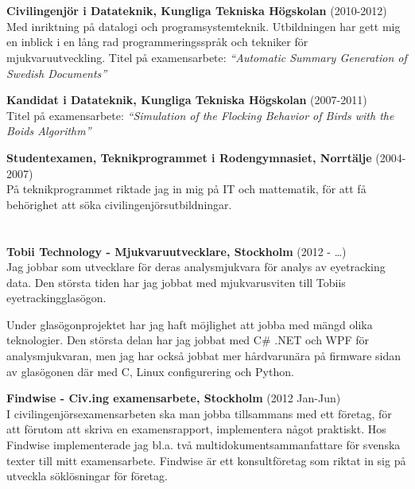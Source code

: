 \documentclass[margin,line]{resume}%
\begin{document}
\begin{resume}
	\section{}\vspace{0.001mm}

	\textbf{Civilingenjör i Datateknik, Kungliga Tekniska Högskolan}
	(2010-2012)\\
	Med inriktning på datalogi och programsystemteknik.
	Utbildningen har gett mig en inblick i en lång rad programmeringsspråk och
	tekniker för mjukvaruutveckling. Titel på examensarbete: \textit{``Automatic Summary Generation of Swedish
	Documents''}

	\textbf{Kandidat i Datateknik, Kungliga Tekniska Högskolan}
	(2007-2011)\\
	Titel på examensarbete: \textit{``Simulation of the Flocking Behavior of
	Birds with the Boids Algorithm''}

	\textbf{Studentexamen, Teknikprogrammet i Rodengymnasiet, Norrtälje} (2004-2007)\\
	På teknikprogrammet riktade jag in mig på IT och mattematik,
	för att få behörighet att söka civilingenjörsutbildningar.

	\section{}\vspace{0.001mm}

		\textbf{Tobii Technology - Mjukvaruutvecklare, Stockholm } (2012 - \dots)\\
		Jag jobbar som utvecklare för deras analysmjukvara för analys av
		eyetracking data. Den största tiden har jag jobbat med mjukvarusviten
		till Tobiis eyetrackingglasögon. 
		
		Under glasögonprojektet har jag haft möjlighet att jobba med mängd olika
		teknologier. Den största delan har jag jobbat med C\# .NET och WPF för
		analysmjukvaran, men jag har också jobbat mer hårdvarunära på firmware
		sidan av glasögonen där med C, Linux configurering och Python.
\newpage

		\textbf{Findwise - Civ.ing examensarbete, Stockholm } (2012 Jan-Jun)\\
		I civilingenjörsexamensarbeten ska man jobba tillsammans med ett företag, för att
		förutom att skriva en examensrapport, implementera något praktiskt.
		Hos Findwise implementerade jag bl.a. två multidokumentsammanfattare för
		svenska texter till mitt examensarbete. Findwise är ett konsultföretag som
		riktat in sig på utveckla söklösningar för företag.


\end{resume}
\end{document}
